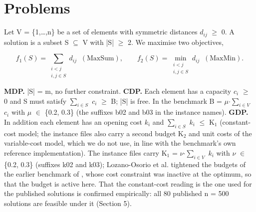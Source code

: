 \section{Problems}\label{sec:problems}

Let V = \{1,\ldots{},n\} be a set of elements with symmetric distances $d_{ij}$ $\geq$ 0. A solution is a subset S $\subseteq$ V with |S| $\geq$ 2. We maximise two objectives,

\begin{equation*}
f_1(S) = \sum_{\substack{i<j\\ i,j\in S}} d_{ij}\;\; (\text{MaxSum}), \qquad f_2(S) = \min_{\substack{i<j\\ i,j\in S}} d_{ij}\;\; (\text{MaxMin}).
\end{equation*}

\noindent \textbf{MDP.} |S| = m, no further constraint. \textbf{CDP.} Each element has a capacity $c_{i}$ $\geq$ 0 and S must satisfy $\sum_{i\in S}$ $c_{i}$ $\geq$ B; |S| is free. In the benchmark B = $\mu$$\cdot$$\sum_{i\in V}$ $c_{i}$ with $\mu$ $\in$ \{0.2, 0.3\} (the suffixes b02 and b03 in the instance names). \textbf{GDP.} In addition each element has an opening cost $k_{i}$ and $\sum_{i\in S}$ $k_{i}$ $\leq$ K$_{1}$ (constant-cost model; the instance files also carry a second budget K$_{2}$ and unit costs of the variable-cost model, which we do not use, in line with the benchmark's own reference implementation). The instance files carry K$_{1}$ = $\nu$$\cdot$$\sum_{i\in V}$ $k_{i}$ with $\nu$ $\in$ \{0.2, 0.3\} (suffixes k02 and k03); Lozano-Osorio et al. tightened the budgets of the earlier benchmark of \citet{martinezgavara2021}, whose cost constraint was inactive at the optimum, so that the budget is active here. That the constant-cost reading is the one used for the published solutions is confirmed empirically: all 80 published n = 500 solutions are feasible under it (Section 5).

